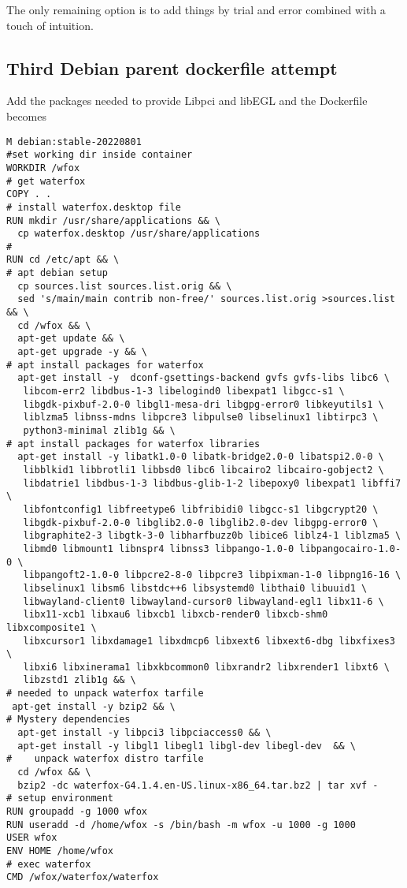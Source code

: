 \documentclass[a4paper]{article}  %
\begin{document}
The only remaining option is to add things by trial and error combined with a touch of intuition.

\subsection{Third Debian parent dockerfile attempt}
 Add the packages needed to provide Libpci and libEGL and the Dockerfile becomes
\begin{tcolorbox}
\begin{verbatim}
M debian:stable-20220801
#set working dir inside container
WORKDIR /wfox
# get waterfox
COPY . .
# install waterfox.desktop file
RUN mkdir /usr/share/applications && \
  cp waterfox.desktop /usr/share/applications
#
RUN cd /etc/apt && \
# apt debian setup
  cp sources.list sources.list.orig && \
  sed 's/main/main contrib non-free/' sources.list.orig >sources.list && \
  cd /wfox && \
  apt-get update && \
  apt-get upgrade -y && \
# apt install packages for waterfox
  apt-get install -y  dconf-gsettings-backend gvfs gvfs-libs libc6 \
   libcom-err2 libdbus-1-3 libelogind0 libexpat1 libgcc-s1 \
   libgdk-pixbuf-2.0-0 libgl1-mesa-dri libgpg-error0 libkeyutils1 \
   liblzma5 libnss-mdns libpcre3 libpulse0 libselinux1 libtirpc3 \
   python3-minimal zlib1g && \
# apt install packages for waterfox libraries
  apt-get install -y libatk1.0-0 libatk-bridge2.0-0 libatspi2.0-0 \
   libblkid1 libbrotli1 libbsd0 libc6 libcairo2 libcairo-gobject2 \
   libdatrie1 libdbus-1-3 libdbus-glib-1-2 libepoxy0 libexpat1 libffi7 \
   libfontconfig1 libfreetype6 libfribidi0 libgcc-s1 libgcrypt20 \
   libgdk-pixbuf-2.0-0 libglib2.0-0 libglib2.0-dev libgpg-error0 \
   libgraphite2-3 libgtk-3-0 libharfbuzz0b libice6 liblz4-1 liblzma5 \
   libmd0 libmount1 libnspr4 libnss3 libpango-1.0-0 libpangocairo-1.0-0 \
   libpangoft2-1.0-0 libpcre2-8-0 libpcre3 libpixman-1-0 libpng16-16 \
   libselinux1 libsm6 libstdc++6 libsystemd0 libthai0 libuuid1 \
   libwayland-client0 libwayland-cursor0 libwayland-egl1 libx11-6 \
   libx11-xcb1 libxau6 libxcb1 libxcb-render0 libxcb-shm0 libxcomposite1 \
   libxcursor1 libxdamage1 libxdmcp6 libxext6 libxext6-dbg libxfixes3 \
   libxi6 libxinerama1 libxkbcommon0 libxrandr2 libxrender1 libxt6 \
   libzstd1 zlib1g && \
# needed to unpack waterfox tarfile
 apt-get install -y bzip2 && \
# Mystery dependencies
  apt-get install -y libpci3 libpciaccess0 && \
  apt-get install -y libgl1 libegl1 libgl-dev libegl-dev  && \
#    unpack waterfox distro tarfile
  cd /wfox && \
  bzip2 -dc waterfox-G4.1.4.en-US.linux-x86_64.tar.bz2 | tar xvf -
# setup environment
RUN groupadd -g 1000 wfox
RUN useradd -d /home/wfox -s /bin/bash -m wfox -u 1000 -g 1000
USER wfox
ENV HOME /home/wfox
# exec waterfox
CMD /wfox/waterfox/waterfox
\end{verbatim}
\end{tcolorbox}
\end{document}
